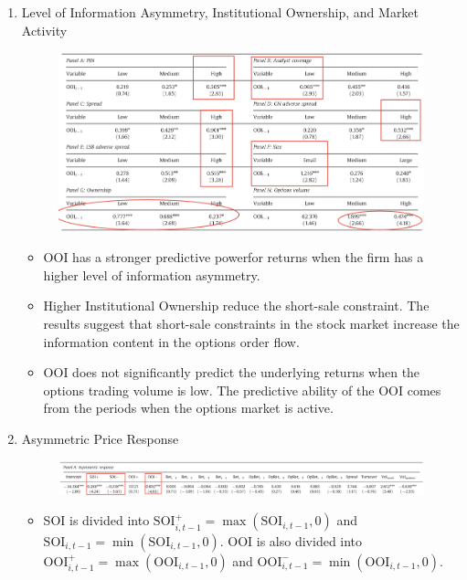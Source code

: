 \documentclass[10pt]{report}
\begin{document}
\begin{enumerate}
    \item Level of Information Asymmetry, Institutional Ownership, and Market Activity
    \begin{figure}[!h]
        \centering
        \includegraphics[width=1\linewidth]{p9.png}
    \end{figure}
    \begin{itemize}
        \item OOI has a stronger predictive powerfor returns when the firm has a higher level of information asymmetry.
        \item Higher Institutional Ownership reduce the short-sale constraint. The results suggest that short-sale constraints in the stock market increase the information content in the options order flow.
        \item OOI does not significantly predict the underlying returns when the options trading volume is low. The predictive ability of the OOI comes from the periods when the options market is active. 
    \end{itemize}
    \item Asymmetric Price Response
    \begin{figure}[!h]
        \centering
        \includegraphics[width=1\linewidth]{p10.png}
    \end{figure}
    \begin{itemize}
        \item SOI is divided into  $\mathrm{SOI}_{i, t-1}^{+}=\max \left(\mathrm{SOI}_{i, t-1}, 0\right)$ and $\mathrm{SOI}_{i, t-1}=\min \left(\mathrm{SOI}_{i, t-1}, 0\right)$. OOI is also divided into $\mathrm{OOI}_{i, t-1}^{+}=\max \left(\mathrm{OOI}_{i, t-1}, 0\right)$ and $\mathrm{OOI}_{i, t-1}^{-}=\min \left(\mathrm{OOI}_{i, t-1}, 0\right)$.

\end{itemize}
\end{enumerate}
\end{document}
